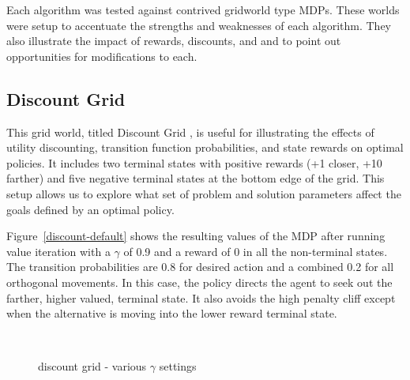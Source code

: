 \documentclass{sig-alternate}
\begin{document}
Each algorithm was tested against contrived gridworld type MDPs. These worlds were setup to accentuate the strengths and weaknesses of each algorithm. They also illustrate the impact of rewards, discounts, and  and to point out opportunities for modifications to each.

\subsection{Discount Grid}

This grid world, titled Discount Grid \cite{project3}, is useful for illustrating the effects of utility discounting, transition function probabilities, and state rewards on optimal policies. It includes two terminal states with positive rewards (+1 closer, +10 farther) and five negative terminal states at the bottom edge of the grid. This setup allows us to explore what set of problem and solution parameters affect the goals defined by an optimal policy.

Figure~\ref{discount-default} shows the resulting values of the MDP after running value iteration with a $\gamma$ of 0.9 and a reward of 0 in all the non-terminal states. The transition probabilities are 0.8 for desired action and a combined 0.2 for all orthogonal movements. In this case, the policy directs the agent to seek out the farther, higher valued, terminal state. It also avoids the high penalty cliff except when the alternative is moving into the lower reward terminal state.

\begin{figure}[!htbp]
    \centering
    ~
    \caption{discount grid - various $\gamma$ settings}
\end{figure} 
\end{document}
